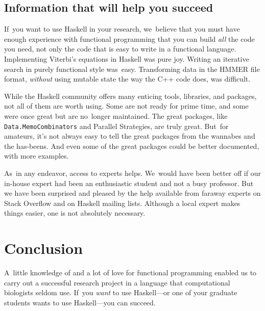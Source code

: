 \documentclass[preprint,nonatbib,blockstyle,times]{sigplanconf}
\newcommand\seclabel[1]{\label{sec:#1}}
\begin{document}
\subsection{Information that will help you succeed}

If~you want to use Haskell in your research, we~believe that you must
have enough experience with functional programming that you can build
\emph{all} the code you need, not only the code that is easy to write
in a functional language.
Implementing Viterbi's equations in Haskell was pure joy.
Writing an iterative search in purely functional style was~easy.
Transforming data in the HMMER file format, \emph{without}
using mutable state the way the C++ code does, was difficult.

\seclabel{penumbra}

While the Haskell community offers many
enticing tools, libraries, and packages,
not all of them are worth using.
Some are not ready for prime time, and some were once great but are
no~longer maintained.
The great packages, like \texttt{Data.MemoCombinators} and Parallel
Strategies, are truly great.
But~for amateurs, it's not always easy to tell the great packages from the wannabes
and the has-beens.
And even some of the great packages could be better documented, with
more examples.



As~in any endeavor, access to experts helps.
We~would have been better off if our in-house expert had been an
enthusiastic student and not a busy professor.
But we have been surprised and pleased by the help available from
faraway experts on Stack Overflow and on Haskell mailing lists.
Although a local expert makes things easier, one is not
 absolutely necessary.

\section{Conclusion}

A~little knowledge of and a lot of love for functional programming
enabled us to carry out a successful research project in a language
that computational biologists seldom use.
If~you \emph{want} to use Haskell---or one of your graduate students
wants to use Haskell---you can
succeed. 
\end{document}
